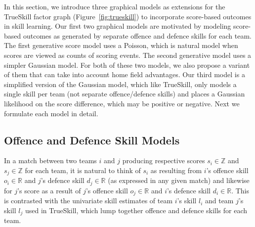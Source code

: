 In this section, we introduce three graphical models as extensions for
the TrueSkill factor graph (Figure~\ref{fig:trueskill}) to incorporate
score-based outcomes in skill learning. Our first two graphical
models are motivated by modeling score-based outcomes as generated by
separate offence and defence skills for each team.  The first
generative score model uses a Poisson, which is natural model when
scores are viewed as counts of scoring events.  The second generative
model uses a simpler Gaussian model. For both of these two models, we also propose a variant of them that can take into account home field advantages. Our third model is a simplified
version of the Gaussian model, which like TrueSkill, only models a
single skill per team (not separate offence/defence skills) and places
a Gaussian likelihood on the score difference, which may be positive
or negative.  Next we formulate each model in detail.

\subsection{Offence and Defence Skill Models}
\label{sec:PoissonGraphicalModel}

In a match between two teams $i$ and $j$ producing respective scores
$s_i \in \mathbb{Z}$ and $s_j \in \mathbb{Z}$ for each team, it is natural to
think of $s_i$ as resulting from $i$'s offence skill $o_i \in \mathbb{R}$
and $j$'s defence skill $d_j \in \mathbb{R}$
(as expressed in any given match) and
likewise for $j$'s score as a result of $j$'s offence skill
$o_j \in \mathbb{R}$
and $i$'s defence skill $d_i \in \mathbb{R}$.  This is contrasted
with the univariate skill estimates of team $i$'s skill $l_i$
and team $j$'s skill $l_j$ used in TrueSkill, which lump together
offence and defence skills for each team.

